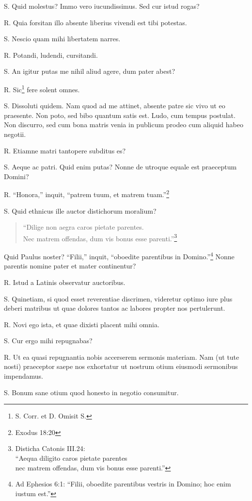\documentclass{article}
\begin{document}
S. Quid molestus? Immo vero iucundissimus. Sed cur istud rogas?

R. Quia forsitan illo absente liberius vivendi est tibi potestas.

S. Nescio quam mihi libertatem narres.

R. Potandi, ludendi, cursitandi.

S. An igitur putas me nihil aliud agere, dum pater abest?

R. Sic\footnote{S. Corr. et  D. Omisit S.} fere solent omnes.

S. Dissoluti quidem. Nam quod ad me attinet, absente patre sic vivo ut eo praesente. Non poto, sed bibo quantum satis est. Ludo, cum tempus postulat. Non discurro, sed cum bona matris venia in publicum prodeo cum aliquid habeo negotii.

R. Etiamne matri tantopere subditus es?

S. Aeque ac patri. Quid enim putas? Nonne de utroque equale est praeceptum Domini?

R. ``Honora,'' inquit, ``patrem tuum, et matrem tuam.''\footnote{Exodus 18:20}

S. Quid ethnicus ille auctor distichorum moralium?\begin{verse} ``Dilige non aegra caros pietate parentes.\\Nec matrem offendas, dum vis bonus esse parenti.''\footnote{Disticha Catonis III.24:\\``Aequa diligito caros pietate parentes\\nec matrem offendas, dum vis bonus esse parenti.''}\end{verse} Quid Paulus noster? ``Filii,'' inquit, ``oboedite parentibus in Domino.''\footnote{Ad Ephesios 6:1: ``Filii, oboedite parentibus vestris in Domino; hoc enim iustum est.''} Nonne parentis nomine pater et mater continentur?

R. Istud a Latinis observatur auctoribus.

S. Quinetiam, si quod esset reverentiae discrimen, videretur optimo iure plus deberi matribus ut quae dolores tantos ac labores propter nos pertulerunt.

R. Novi ego ista, et quae dixisti placent mihi omnia.

S. Cur ergo mihi repugnabas?

R. Ut ea quasi repugnantia nobis accerserem sermonis materiam. Nam (ut tute nosti) praeceptor saepe nos exhortatur ut nostrum otium eiusmodi sermonibus impendamus.

S. Bonum sane otium quod honesto in negotio consumitur.
\end{document}
